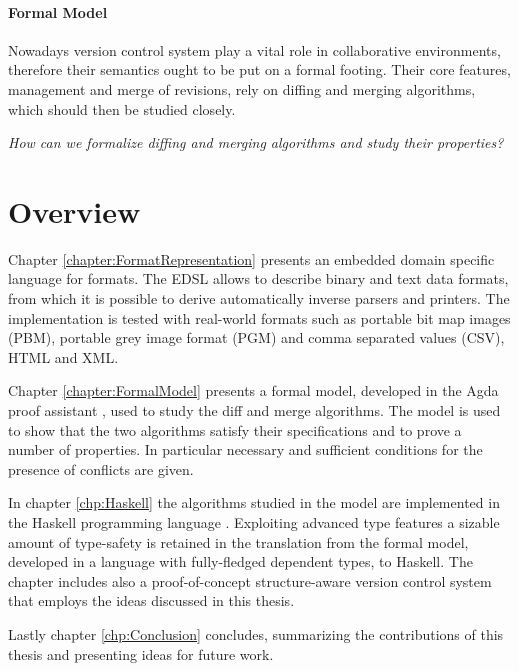 \documentclass[../Thesis.tex]{subfiles}
\begin{document}
\paragraph{Formal Model}
Nowadays version control system play a vital role in collaborative environments, therefore their semantics ought to be put on a formal footing.
Their core features, management and merge of revisions, 
rely on diffing and merging algorithms, which should then be studied
closely.

\emph{How can we formalize diffing and merging algorithms and study
their properties?}



\section{Overview}
Chapter \ref{chapter:FormatRepresentation} presents an embedded domain specific language for formats.
The EDSL allows to describe binary and text data formats, from which it 
is possible to derive automatically inverse parsers and printers.
The implementation is tested with real-world formats such as portable bit 
map images (PBM), portable grey image format (PGM) and comma separated 
values (CSV), HTML and XML.

Chapter \ref{chapter:FormalModel} presents a formal model, developed
in the Agda proof assistant \cite{Norell08, Bove09}, used to study the diff and merge algorithms.
The model is used to show that the two algorithms satisfy their specifications and to prove a number of properties.
In particular necessary and sufficient conditions for the presence of conflicts
are given.

In chapter \ref{chp:Haskell} the algorithms studied in the model are 
implemented in the Haskell programming language \cite{Marlow_haskell2010}.
Exploiting advanced type features a sizable amount of type-safety
is retained in the translation from the formal model, developed
in a language with fully-fledged dependent types, to Haskell.
The chapter includes also a proof-of-concept structure-aware version control system that employs the ideas discussed
in this thesis.

Lastly chapter \ref{chp:Conclusion} concludes, summarizing
the contributions of this thesis and presenting ideas for future
work.


\end{document}
